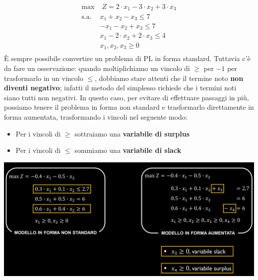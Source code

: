 \documentclass[12pt]{article}
\begin{document}
\begin{equation*}
    \begin{array}{ll}
        \displaystyle \textrm{max} & \; Z = 2 \cdot x_1 - 3 \cdot x_2 + 3\cdot x_3\\
        \textrm{s.a.} & x_1 + x_2 - x_3 \leq 7\\
        \phantom{} & -x_1 - x_2 + x_3 \leq 7 \\
        \phantom{} & x_1 - 2 \cdot x_2 + 2 \cdot x_3 \leq 4\\
        \phantom{} & x_1, x_2, x_3 \geq 0 \\
    \end{array}
\end{equation*}
È sempre possibile convertire un problema di PL in forma standard. Tuttavia c'è da fare un osservazione:
quando moltiplichiamo un vincolo di $\geq$ per $-1$ per trasformarlo in un vincolo $\leq$, dobbiamo stare attenti
che il termine noto \textbf{non diventi negativo}; infatti il metodo del simplesso richiede che i termini noti siano
tutti non negativi. In questo caso, per evitare di effettuare passaggi in più, possiamo tenere il problema in forma non standard
e trasformarlo direttamente in forma aumentata, trasformando i vincoli nel seguente modo:
\begin{itemize}
    \item Per i vincoli di $\geq$ sottraiamo una \textbf{variabile di surplus}
    \item Per i vincoli di $\leq$ sommiamo una \textbf{variabile di slack}
\end{itemize}
\begin{center}
    \includegraphics[width = 1\linewidth]{Images/34.PNG}
\end{center}
\end{document}
